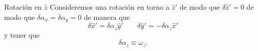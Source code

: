 \documentclass[10pt,oneside]{CBFT_book}
\begin{document}
\begin{ejemplillo}{Rotación en $\hat{z}$}
Consideremos una rotación en torno a $\hat{z}'$ de modo que $\delta\hat{z}'=0$ de modo que $\delta\alpha_x=\delta\alpha_y=0$
de manera que 
\[
	\delta\hat{x}' = \delta\alpha_z \hat{y}' \qquad \delta\hat{y}' = - \delta\alpha_z \hat{x}'
\]
y tener que 
\[
	\delta \alpha_z \equiv \omega_z . 
\]
\end{ejemplillo}


\end{document}
